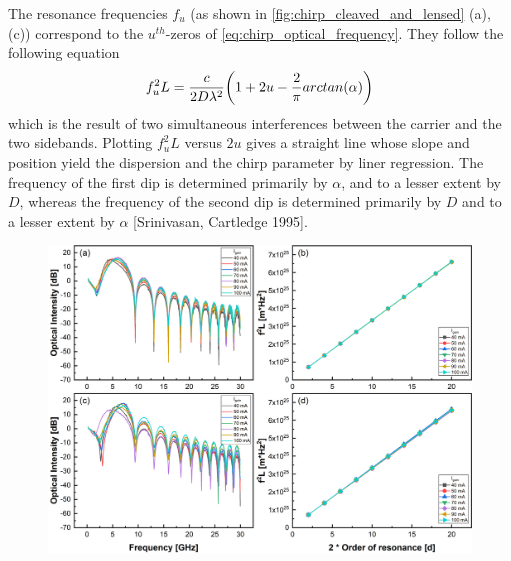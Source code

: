 The resonance frequencies $f_u$ (as shown in \autoref{fig:chirp_cleaved_and_lensed} (a), (c)) correspond to the $u^{th}$-zeros of \autoref{eq:chirp_optical_frequency}. They follow the following equation \cite{devaux1993simple}
\begin{equation}
    f_u^2L=\frac{c}{2D\lambda ^2}\qty(1+2u-\frac{2}{\pi}arctan(\alpha))
    \label{eq:LCA_equation}
\end{equation}
which is the result of two simultaneous interferences between the carrier and the two sidebands. Plotting $f_u^2L$ versus $2u$ gives a straight line whose slope and position yield the dispersion and the chirp parameter by liner regression. The frequency of the first dip is determined primarily by $\alpha$, and to a lesser extent by $D$, whereas the frequency of the second dip is determined primarily by $D$ and to a lesser extent by $\alpha$ [Srinivasan, Cartledge 1995].

\begin{figure}[ht]
    \centering
    \includegraphics[width=\linewidth]{figures/chirp_cleaved_and_lensed_4679.png}
    \caption{}
    \label{fig:chirp_cleaved_and_lensed}
\end{figure}

